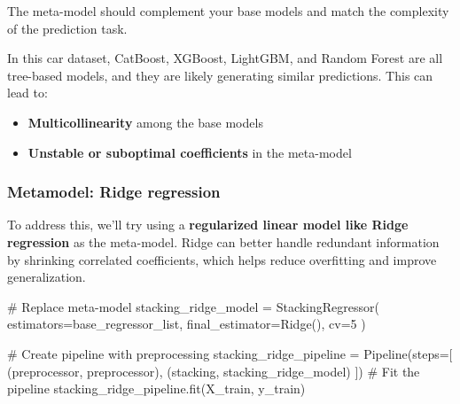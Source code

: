 \documentclass[
  letterpaper,
  DIV=11,
  numbers=noendperiod]{scrreprt}
\newenvironment{Shaded}{\begin{snugshade}}{\end{snugshade}}
\newcommand{\CommentTok}[1]{\textcolor[rgb]{0.37,0.37,0.37}{#1}}
\newcommand{\DecValTok}[1]{\textcolor[rgb]{0.68,0.00,0.00}{#1}}
\newcommand{\NormalTok}[1]{\textcolor[rgb]{0.00,0.23,0.31}{#1}}
\newcommand{\OperatorTok}[1]{\textcolor[rgb]{0.37,0.37,0.37}{#1}}
\newcommand{\StringTok}[1]{\textcolor[rgb]{0.13,0.47,0.30}{#1}}
\providecommand{\tightlist}{%
  \setlength{\itemsep}{0pt}\setlength{\parskip}{0pt}}\usepackage{longtable,booktabs,array}
\begin{document}
The meta-model should complement your base models and match the
complexity of the prediction task.

In this car dataset, CatBoost, XGBoost, LightGBM, and Random Forest are
all tree-based models, and they are likely generating similar
predictions. This can lead to:

\begin{itemize}
\tightlist
\item
  \textbf{Multicollinearity} among the base models\\
\item
  \textbf{Unstable or suboptimal coefficients} in the meta-model
\end{itemize}

\subsubsection{Metamodel: Ridge
regression}\label{metamodel-ridge-regression}

To address this, we'll try using a \textbf{regularized linear model like
Ridge regression} as the meta-model. Ridge can better handle redundant
information by shrinking correlated coefficients, which helps reduce
overfitting and improve generalization.

\begin{Shaded}
\begin{Highlighting}[]
\CommentTok{\# Replace meta{-}model}
\NormalTok{stacking\_ridge\_model }\OperatorTok{=}\NormalTok{ StackingRegressor(}
\NormalTok{    estimators}\OperatorTok{=}\NormalTok{base\_regressor\_list,}
\NormalTok{    final\_estimator}\OperatorTok{=}\NormalTok{Ridge(),}
\NormalTok{    cv}\OperatorTok{=}\DecValTok{5}
\NormalTok{)}

\CommentTok{\# Create pipeline with preprocessing}
\NormalTok{stacking\_ridge\_pipeline }\OperatorTok{=}\NormalTok{ Pipeline(steps}\OperatorTok{=}\NormalTok{[}
\NormalTok{    (}\StringTok{\textquotesingle{}preprocessor\textquotesingle{}}\NormalTok{, preprocessor),}
\NormalTok{    (}\StringTok{\textquotesingle{}stacking\textquotesingle{}}\NormalTok{, stacking\_ridge\_model)}
\NormalTok{])}
\CommentTok{\# Fit the pipeline}
\NormalTok{stacking\_ridge\_pipeline.fit(X\_train, y\_train)}
\end{Highlighting}
\end{Shaded}
\end{document}
